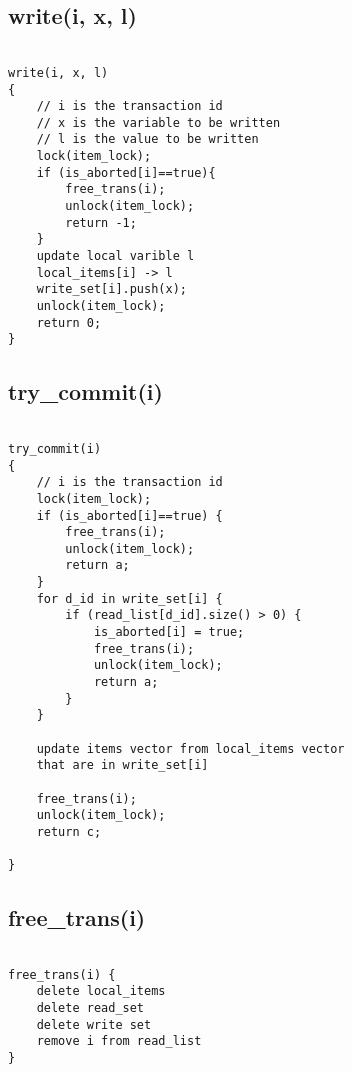 \documentclass[12pt]{article}
\begin{document}
\subsection*{write(i, x, l)}

\begin{lstlisting}

write(i, x, l)
{
    // i is the transaction id
    // x is the variable to be written
    // l is the value to be written
    lock(item_lock);
    if (is_aborted[i]==true){
        free_trans(i);
        unlock(item_lock);
        return -1;
    }    
    update local varible l
    local_items[i] -> l
    write_set[i].push(x);
    unlock(item_lock);
    return 0;
}

\end{lstlisting}

\subsection*{try\_commit(i)}

\begin{lstlisting}
    
try_commit(i)
{
    // i is the transaction id
    lock(item_lock);
    if (is_aborted[i]==true) {
        free_trans(i);
        unlock(item_lock);
        return a;
    }
    for d_id in write_set[i] {
        if (read_list[d_id].size() > 0) {
            is_aborted[i] = true;
            free_trans(i);
            unlock(item_lock);
            return a;
        }
    }
    
    update items vector from local_items vector 
    that are in write_set[i]

    free_trans(i);
    unlock(item_lock);
    return c;

}

\end{lstlisting}

\subsection*{free\_trans(i)}

\begin{lstlisting}
    
free_trans(i) {
    delete local_items 
    delete read_set
    delete write set
    remove i from read_list
}

\end{lstlisting}
\end{document}
